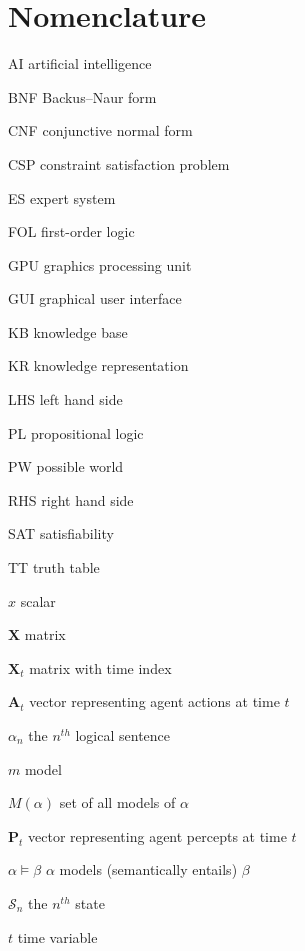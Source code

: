\chapter{Nomenclature}
\label{nomenclature}

\begin{Nomencl}[4em]
	
	\item[AI] artificial intelligence
	\item[BNF] Backus–Naur form  
	\item[CNF] conjunctive normal form
	\item[CSP] constraint satisfaction problem
	\item[ES] expert system 	
	\item[FOL] first-order logic
	\item[GPU] graphics processing unit
	\item[GUI] graphical user interface
    \item[KB] knowledge base
    \item[KR] knowledge representation
    \item[LHS] left hand side
    \item[PL] propositional logic
    \item[PW] possible world
    \item[RHS] right hand side
    \item[SAT] satisfiability
    \item[TT] truth table
    
   
	\item[$x$] scalar
	\item[$\mathbf{X}$] matrix
   	\item[$\mathbf{X}_t$] matrix with time index 



   
   \item[$\mathbf{A}_t$] vector representing agent actions at time $t$
   
   	\item[$\alpha_n$]  the $n^{th}$ logical sentence
   	\item[$m$]  model
   	\item[$M(\alpha)$]  set of all models of $\alpha$
	\item[$\mathbf{P}_t$] vector representing agent percepts at time $t$  
   	\item[$\alpha \models \beta$]  $\alpha$ models (semantically entails) $\beta$
   	\item[$\mathcal{S}_n$] the $n^{th}$ state
   	\item[$t$] time variable



\end{Nomencl}


\endinput
